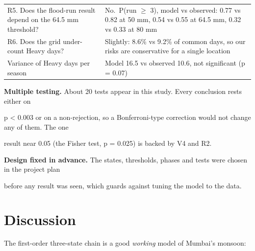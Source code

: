 \documentclass[11pt,a4paper]{article}
\begin{document}
{\begin{longtable}[]{@{}

  >{\raggedright\arraybackslash}p{}

  >{\raggedright\arraybackslash}p{}@{}}
R5. Does the flood-run result depend on the 64.5 mm threshold? & No.~P(run $\geq$ 3), model vs observed: 0.77 vs 0.82 at 50 mm, 0.54 vs 0.55 at 64.5 mm, 0.32 vs 0.33 at 80 mm \\

R6. Does the grid under-count Heavy days? & Slightly: 8.6\% vs 9.2\% of common days, so our risks are conservative for a single location \\

Variance of Heavy days per season & Model 16.5 vs observed 10.6, not significant (p = 0.07) \\

\end{longtable}

}



\textbf{Multiple testing.} About 20 tests appear in this study. Every conclusion rests either on

p \textless{} 0.003 or on a non-rejection, so a Bonferroni-type correction would not change any of them. The one

result near 0.05 (the Fisher test, p = 0.025) is backed by V4 and R2.



\textbf{Design fixed in advance.} The states, thresholds, phases and tests were chosen in the project plan

before any result was seen, which guards against tuning the model to the data.



\section{Discussion}\label{discussion}



The first-order three-state chain is a good \emph{working} model of Mumbai's monsoon:
\end{document}
